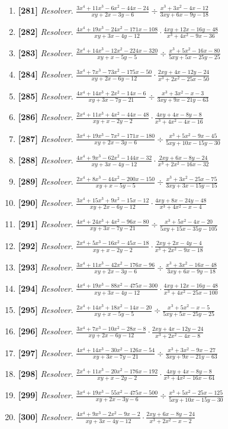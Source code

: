 \documentclass[11pt,a4paper]{article}
\newcommand{\ejercicio}[3]{\item \textbf{[#1]} \textit{#2}. $ #3 $}
\begin{document}
\begin{enumerate}
\ejercicio{281}{Resolver}{\frac{3 x^{4} + 11 x^{3} - 6 x^{2} - 44 x - 24}{x y + 2 x - 3 y - 6} \div \frac{x^{3} + 3 x^{2} - 4 x - 12}{3 x y + 6 x - 9 y - 18}}
\ejercicio{282}{Resolver}{\frac{4 x^{4} + 19 x^{3} - 24 x^{2} - 171 x - 108}{x y + 3 x - 4 y - 12} \cdot \frac{4 x y + 12 x - 16 y - 48}{x^{3} + 4 x^{2} - 9 x - 36}}
\ejercicio{283}{Resolver}{\frac{2 x^{4} + 14 x^{3} - 12 x^{2} - 224 x - 320}{x y + x - 5 y - 5} \div \frac{x^{3} + 5 x^{2} - 16 x - 80}{5 x y + 5 x - 25 y - 25}}
\ejercicio{284}{Resolver}{\frac{3 x^{4} + 7 x^{3} - 73 x^{2} - 175 x - 50}{x y + 2 x - 6 y - 12} \cdot \frac{2 x y + 4 x - 12 y - 24}{x^{3} + 2 x^{2} - 25 x - 50}}
\ejercicio{285}{Resolver}{\frac{4 x^{4} + 14 x^{3} + 2 x^{2} - 14 x - 6}{x y + 3 x - 7 y - 21} \div \frac{x^{3} + 3 x^{2} - x - 3}{3 x y + 9 x - 21 y - 63}}
\ejercicio{286}{Resolver}{\frac{2 x^{4} + 11 x^{3} + 4 x^{2} - 44 x - 48}{x y + x - 2 y - 2} \cdot \frac{4 x y + 4 x - 8 y - 8}{x^{3} + 4 x^{2} - 4 x - 16}}
\ejercicio{287}{Resolver}{\frac{3 x^{4} + 19 x^{3} - 7 x^{2} - 171 x - 180}{x y + 2 x - 3 y - 6} \div \frac{x^{3} + 5 x^{2} - 9 x - 45}{5 x y + 10 x - 15 y - 30}}
\ejercicio{288}{Resolver}{\frac{4 x^{4} + 9 x^{3} - 62 x^{2} - 144 x - 32}{x y + 3 x - 4 y - 12} \cdot \frac{2 x y + 6 x - 8 y - 24}{x^{3} + 2 x^{2} - 16 x - 32}}
\ejercicio{289}{Resolver}{\frac{2 x^{4} + 8 x^{3} - 44 x^{2} - 200 x - 150}{x y + x - 5 y - 5} \div \frac{x^{3} + 3 x^{2} - 25 x - 75}{3 x y + 3 x - 15 y - 15}}
\ejercicio{290}{Resolver}{\frac{3 x^{4} + 15 x^{3} + 9 x^{2} - 15 x - 12}{x y + 2 x - 6 y - 12} \cdot \frac{4 x y + 8 x - 24 y - 48}{x^{3} + 4 x^{2} - x - 4}}
\ejercicio{291}{Resolver}{\frac{4 x^{4} + 24 x^{3} + 4 x^{2} - 96 x - 80}{x y + 3 x - 7 y - 21} \div \frac{x^{3} + 5 x^{2} - 4 x - 20}{5 x y + 15 x - 35 y - 105}}
\ejercicio{292}{Resolver}{\frac{2 x^{4} + 5 x^{3} - 16 x^{2} - 45 x - 18}{x y + x - 2 y - 2} \cdot \frac{2 x y + 2 x - 4 y - 4}{x^{3} + 2 x^{2} - 9 x - 18}}
\ejercicio{293}{Resolver}{\frac{3 x^{4} + 11 x^{3} - 42 x^{2} - 176 x - 96}{x y + 2 x - 3 y - 6} \div \frac{x^{3} + 3 x^{2} - 16 x - 48}{3 x y + 6 x - 9 y - 18}}
\ejercicio{294}{Resolver}{\frac{4 x^{4} + 19 x^{3} - 88 x^{2} - 475 x - 300}{x y + 3 x - 4 y - 12} \cdot \frac{4 x y + 12 x - 16 y - 48}{x^{3} + 4 x^{2} - 25 x - 100}}
\ejercicio{295}{Resolver}{\frac{2 x^{4} + 14 x^{3} + 18 x^{2} - 14 x - 20}{x y + x - 5 y - 5} \div \frac{x^{3} + 5 x^{2} - x - 5}{5 x y + 5 x - 25 y - 25}}
\ejercicio{296}{Resolver}{\frac{3 x^{4} + 7 x^{3} - 10 x^{2} - 28 x - 8}{x y + 2 x - 6 y - 12} \cdot \frac{2 x y + 4 x - 12 y - 24}{x^{3} + 2 x^{2} - 4 x - 8}}
\ejercicio{297}{Resolver}{\frac{4 x^{4} + 14 x^{3} - 30 x^{2} - 126 x - 54}{x y + 3 x - 7 y - 21} \div \frac{x^{3} + 3 x^{2} - 9 x - 27}{3 x y + 9 x - 21 y - 63}}
\ejercicio{298}{Resolver}{\frac{2 x^{4} + 11 x^{3} - 20 x^{2} - 176 x - 192}{x y + x - 2 y - 2} \cdot \frac{4 x y + 4 x - 8 y - 8}{x^{3} + 4 x^{2} - 16 x - 64}}
\ejercicio{299}{Resolver}{\frac{3 x^{4} + 19 x^{3} - 55 x^{2} - 475 x - 500}{x y + 2 x - 3 y - 6} \div \frac{x^{3} + 5 x^{2} - 25 x - 125}{5 x y + 10 x - 15 y - 30}}
\ejercicio{300}{Resolver}{\frac{4 x^{4} + 9 x^{3} - 2 x^{2} - 9 x - 2}{x y + 3 x - 4 y - 12} \cdot \frac{2 x y + 6 x - 8 y - 24}{x^{3} + 2 x^{2} - x - 2}}
\end{enumerate}
\newpage
\end{document}
